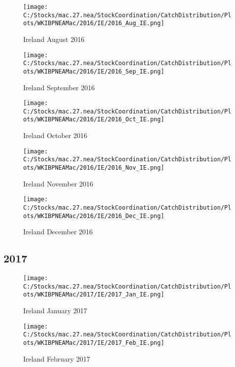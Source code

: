 \documentclass{article}
\begin{document}
\begin{figure}
	\centering
		\texttt{[image: C:/Stocks/mac.27.nea/StockCoordination/CatchDistribution/Plots/WKIBPNEAMac/2016/IE/2016\_Aug\_IE.png]}
	\caption{Ireland August 2016}
	\label{fig:2016_Aug_IE}
\end{figure}

\begin{figure}
	\centering
		\texttt{[image: C:/Stocks/mac.27.nea/StockCoordination/CatchDistribution/Plots/WKIBPNEAMac/2016/IE/2016\_Sep\_IE.png]}
	\caption{Ireland September 2016}
	\label{fig:2016_Sep_IE}
\end{figure}

\begin{figure}
	\centering
		\texttt{[image: C:/Stocks/mac.27.nea/StockCoordination/CatchDistribution/Plots/WKIBPNEAMac/2016/IE/2016\_Oct\_IE.png]}
	\caption{Ireland October 2016}
	\label{fig:2016_Oct_IE}
\end{figure}

\begin{figure}
	\centering
		\texttt{[image: C:/Stocks/mac.27.nea/StockCoordination/CatchDistribution/Plots/WKIBPNEAMac/2016/IE/2016\_Nov\_IE.png]}
	\caption{Ireland November 2016}
	\label{fig:2016_Nov_IE}
\end{figure}

\begin{figure}
	\centering
		\texttt{[image: C:/Stocks/mac.27.nea/StockCoordination/CatchDistribution/Plots/WKIBPNEAMac/2016/IE/2016\_Dec\_IE.png]}
	\caption{Ireland December 2016}
	\label{fig:2016_Dec_IE}
\end{figure}


\clearpage

\newpage

\subsection{2017}



\begin{figure}[h]
	\centering
		\texttt{[image: C:/Stocks/mac.27.nea/StockCoordination/CatchDistribution/Plots/WKIBPNEAMac/2017/IE/2017\_Jan\_IE.png]}
	\caption{Ireland January 2017}
	\label{fig:2017_Jan_IE}
\end{figure}

\begin{figure}
	\centering
		\texttt{[image: C:/Stocks/mac.27.nea/StockCoordination/CatchDistribution/Plots/WKIBPNEAMac/2017/IE/2017\_Feb\_IE.png]}
	\caption{Ireland February 2017}
	\label{fig:2017_Feb_IE}
\end{figure}
\end{document}
